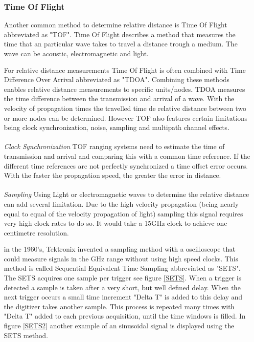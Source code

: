\documentclass[10pt,a4paper]{article}
\begin{document}
\subsubsection{Time Of Flight}
Another common method to determine relative distance is Time Of Flight abbreviated as "TOF". Time Of Flight describes a method that measures the time that an particular wave takes to travel a distance trough a medium. The wave can be acoustic, electromagnetic and light.

For relative distance measurements Time Of Flight is often combined with Time Difference Over Arrival abbreviated as "TDOA". Combining these methods enables relative distance measurements to specific units/nodes. TDOA measures the time difference between the transmission and arrival of a wave. With the velocity of propagation times the travelled time de relative distance between two or more nodes can be determined. However TOF also features certain limitations being clock synchronization, noise, sampling and multipath channel effects.\cite{TOF} 
\\\\
\textit{Clock Synchronization}
TOF ranging systems need to estimate the time of transmission and arrival and comparing this with a common time reference.\cite{TOF} If the different time references are not perfectly synchronized a time offset error occurs. With the faster the propagation speed, the greater the error in distance. 
\\\\
\textit{Sampling}
Using Light or electromagnetic waves to determine the relative distance can add several limitation. Due to the high velocity propagation (being nearly equal to equal of the velocity propagation of light) sampling this signal requires very high clock rates to do so. It would take a 15GHz clock to achieve one centimetre resolution.\cite{Arduino}

in the 1960's, Tektronix invented a sampling method with a oscilloscope that could measure signals in the GHz range without using high speed clocks. This method is called Sequential Equivalent Time Sampling abbreviated as "SETS". The SETS acquires one sample per trigger see figure \ref{SETS}. When a trigger is detected a sample is taken after a very short, but well defined delay. When the next trigger occurs a small time increment "Delta T" is added to this delay and the digitizer takes another sample. This process is repeated many times with "Delta T" added to each previous acquisition, until the time windows is filled.\cite{SETS} In figure \ref{SETS2} another example of an sinusoidal signal is displayed using the SETS method. 
\end{document}
